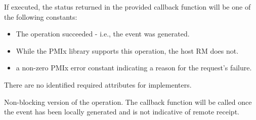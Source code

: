 If executed, the status returned in the provided callback function will be one of the following constants:

\begin{itemize}
\item {} The operation succeeded - i.e., the  event was generated.
\item {} While the \ac{PMIx} library supports this operation, the host \ac{RM} does not.
\item a non-zero \ac{PMIx} error constant indicating a reason for the request's failure.
\end{itemize}


\reqattrstart
There are no identified required attributes for implementers.

\reqattrend

\descr

Non-blocking version of the  operation. The callback function will be called once the event has been locally generated and is not indicative of remote receipt.


